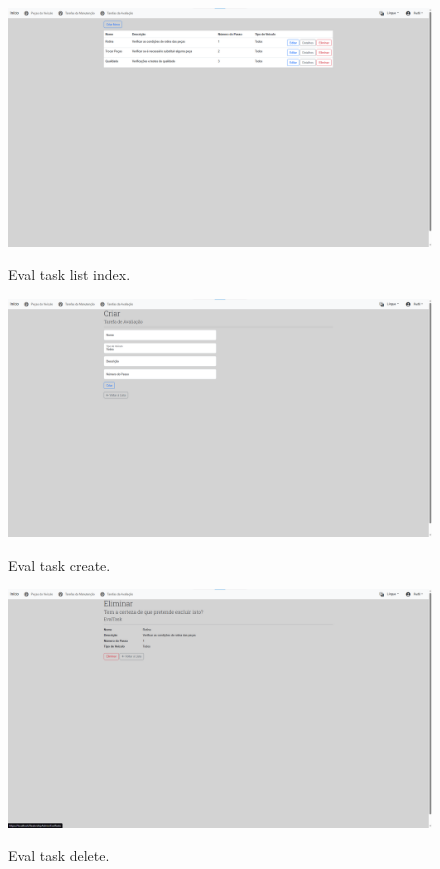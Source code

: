 \begin{figure}[h]
  \caption{Eval task list index.}
  \centering
  \includegraphics[width=\textwidth]{figs/Implementation/dealershipAdmin/evalIndex}
  \label{fig:evalIndex}

\end{figure}
\begin{figure}[h]
  \caption{Eval task create.}
  \centering
  \includegraphics[width=\textwidth]{figs/Implementation/dealershipAdmin/evalCreate}
  \label{fig:evalCreate}
\end{figure}

\begin{figure}[h]
  \caption{Eval task delete.}
  \centering
  \includegraphics[width=\textwidth]{figs/Implementation/dealershipAdmin/evalDelete}
  \label{fig:evalDelete}
\end{figure}

